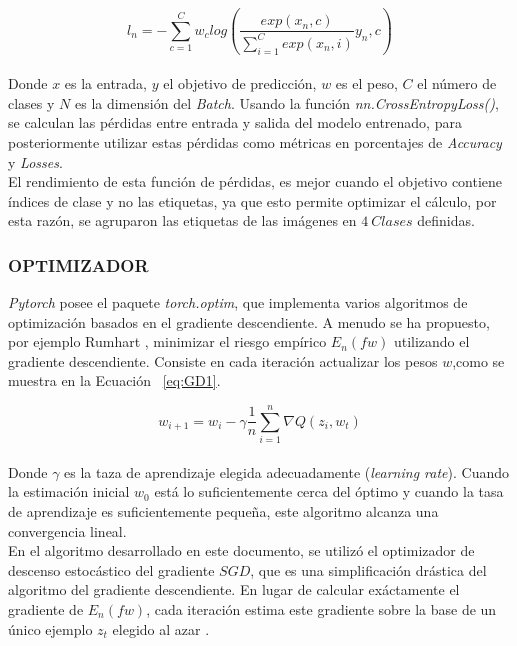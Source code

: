 			\begin{equation}
				\label{eq:perd}
				{l_n=-\sum_{c=1}^{C}w_c log\left(\frac{exp(x_n,c)}{\sum_{i=1}^{C}exp(x_n,i)}y_n,c\right)}
			\end{equation}\\
			
			Donde $x$ es la entrada, $y$ el objetivo de predicción, $w$ es el peso, $C$ el número de clases y $N$ es la dimensión del \textit{Batch}. Usando la función \textit{nn.CrossEntropyLoss()}, se calculan las pérdidas entre entrada y salida del modelo entrenado, para posteriormente utilizar estas pérdidas como métricas en porcentajes de \textit{Accuracy} y \textit{Losses}.\\			
			
			El rendimiento de esta función de pérdidas, es mejor cuando el objetivo contiene índices de clase y no las etiquetas, ya que esto permite optimizar el cálculo, por esta razón, se agruparon las etiquetas de las imágenes en $4 \ Clases$ definidas.
			
			\subsubsection{OPTIMIZADOR}
			
			\textit{Pytorch} posee el paquete \textit{torch.optim}, que implementa varios algoritmos de optimización basados en el gradiente descendiente. A menudo se ha propuesto, por ejemplo Rumhart \cite{rumelhart1986learning}, minimizar el riesgo empírico $E_n(fw)$ utilizando el gradiente descendiente. Consiste en cada iteración actualizar los pesos $w$,como se muestra en la Ecuación ~\ref{eq:GD1}.
			
						
			\begin{equation}
				\label{eq:GD1}
				{w_{i+1}=w_i-\gamma\frac{1}{n}\sum_{i=1}^{n}\nabla Q(z_i,w_t)}
			\end{equation}\\
			
			Donde $\gamma$ es la taza de aprendizaje elegida adecuadamente (\textit{learning rate}). Cuando la estimación inicial $w_0$ está lo suficientemente cerca del óptimo y cuando la tasa de aprendizaje es suficientemente pequeña, este algoritmo alcanza una convergencia lineal.\\
			
			
			En el algoritmo desarrollado en este documento, se utilizó el optimizador de descenso estocástico del gradiente $SGD$, que es una simplificación drástica del algoritmo del gradiente descendiente. En lugar de calcular exáctamente el gradiente de $E_n(fw)$, cada iteración estima este gradiente sobre la base de un único ejemplo $z_t$ elegido al azar \cite{bottou2012stochastic}.
			

